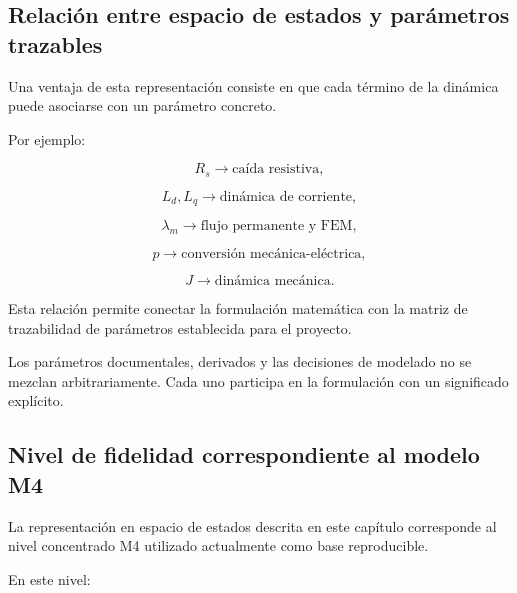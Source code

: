 \subsection{Relación entre espacio de estados y parámetros trazables}

Una ventaja de esta representación consiste en que cada término de la dinámica puede asociarse con un parámetro concreto.

Por ejemplo:

\begin{equation}
R_s
\rightarrow
\text{caída resistiva},
\end{equation}

\begin{equation}
L_d,L_q
\rightarrow
\text{dinámica de corriente},
\end{equation}

\begin{equation}
\lambda_m
\rightarrow
\text{flujo permanente y FEM},
\end{equation}

\begin{equation}
p
\rightarrow
\text{conversión mecánica-eléctrica},
\end{equation}

\begin{equation}
J
\rightarrow
\text{dinámica mecánica}.
\end{equation}

Esta relación permite conectar la formulación matemática con la matriz de trazabilidad de parámetros establecida para el proyecto.

Los parámetros documentales, derivados y las decisiones de modelado no se mezclan arbitrariamente. Cada uno participa en la formulación con un significado explícito.

\subsection{Nivel de fidelidad correspondiente al modelo M4}

La representación en espacio de estados descrita en este capítulo corresponde al nivel concentrado M4 utilizado actualmente como base reproducible.

En este nivel:

